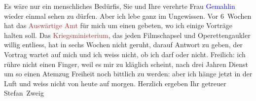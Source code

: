 \pstart
           {\pb}Es wäre nur ein menschliches Bedürfis,
               Sie und Ihre verehrte Frau \textcolor{blue}{Gemahlin}{}\ledrightnote{{$\rightarrow$}\textcolor{blue}{Olga Schnitzler}} wieder einmal sehen zu dürfen. Aber ich lebe ganz im Ungewissen.
               Vor 6 Wochen hat das \textcolor{brown}{Auswärtige Amt}{}\ledrightnote{\textcolor{brown}{Außenministerium}} für mich um einen
               \label{K_L03681-1v}\label{K_L03681-1h} gebeten, wo ich einige
               Vorträge halten soll. Das \textcolor{brown}{Kriegsministerium}{}\ledrightnote{\textcolor{brown}{k. u. k. Kriegsministerium}}, das jeden
               Filmschapsel und Operettengaukler willig entliess, hat in sechs Wochen nicht geruht,
               darauf Antwort zu geben, der Vortrag wartet auf mich und ich weiss nicht, ob ich darf
               oder nicht. Freilich: ich rühre nicht einen Finger, weil es mir zu kläglich scheint,
               nach drei Jahren Dienst um so einen Atemzug Freiheit noch bittlich zu werden: aber
               ich hänge jetzt in der Luft und weiss nicht von heute auf morgen. \pend
           \pstart Herzlich ergeben Ihr getreuer \spacefill\mbox{Stefan Zweig}\pend{}\endnumbering{}
\begin{anhang}
\end{anhang}
      
